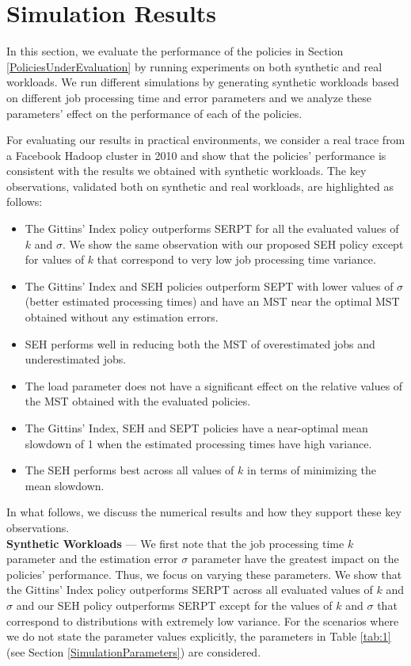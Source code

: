 \section{Simulation Results} \label{SimulationResultsplusInsights}
In this section, we evaluate the performance of the policies in Section \ref{PoliciesUnderEvaluation} by running experiments on both synthetic and real workloads. We run different simulations by generating synthetic workloads based on different job processing time and error parameters and we analyze these parameters' effect on the performance of each of the policies. 


For evaluating our results in practical environments, we consider a real trace from a Facebook Hadoop cluster in 2010 \cite{chen2012interactive} and show that the policies' performance is consistent with the results we obtained with synthetic workloads.
The key observations, validated both on synthetic and real workloads, are highlighted as follows:

\begin{itemize}
\item	The Gittins’ Index policy outperforms SERPT for all the evaluated values of $k$ and $\sigma$. We show the same observation with our proposed SEH policy except for values of $k$ that correspond to very low job processing time variance.
\item The Gittins’ Index and SEH policies outperform SEPT with lower values of $\sigma$ (better estimated processing times) and have an MST near the optimal MST obtained without any estimation errors. 
\item SEH performs well in reducing both the MST of overestimated jobs and underestimated jobs. 
\item	The load parameter does not have a significant effect on the relative values of the MST obtained with the evaluated policies.
\item	The Gittins' Index, SEH and SEPT policies have a near-optimal mean slowdown of 1 when the estimated processing
times have high variance.
\item	The SEH performs best across all values of $k$ in terms of minimizing the mean slowdown.

\end{itemize} 

In what follows, we discuss the numerical results and how they support these key observations. \\


\textbf{Synthetic Workloads} --- We first note that the job processing time $k$ parameter and the estimation error $\sigma$ parameter have the greatest impact on the policies' performance. Thus, we focus on varying these parameters. We show that the Gittins' Index policy outperforms SERPT across all evaluated values of $k$ and $\sigma$ and our SEH policy outperforms SERPT except for the values of $k$ and $\sigma$ that correspond to distributions with extremely low variance. For the scenarios where we do not state the parameter values explicitly, the parameters in Table \ref{tab:1} (see Section \ref{SimulationParameters}) are considered. 

